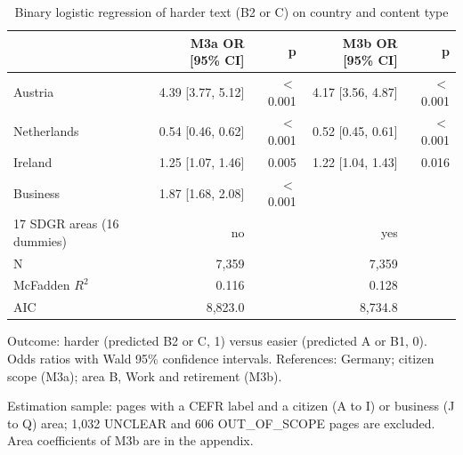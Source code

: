 \begin{table}[htbp]
\centering
\begin{threeparttable}
\caption{Binary logistic regression of harder text (B2 or C) on country and content type}
\label{tab:regression-main}
\begin{tabular}{lrrrr}
\hline
 & M3a OR [95\% CI] & p & M3b OR [95\% CI] & p \\
\hline
Austria & 4.39 [3.77, 5.12] & $<$0.001 & 4.17 [3.56, 4.87] & $<$0.001 \\
Netherlands & 0.54 [0.46, 0.62] & $<$0.001 & 0.52 [0.45, 0.61] & $<$0.001 \\
Ireland & 1.25 [1.07, 1.46] & 0.005 & 1.22 [1.04, 1.43] & 0.016 \\
Business & 1.87 [1.68, 2.08] & $<$0.001 &  &  \\
\hline
17 SDGR areas (16 dummies) & no &  & yes &  \\
N & 7,359 &  & 7,359 &  \\
McFadden $R^2$ & 0.116 &  & 0.128 &  \\
AIC & 8,823.0 &  & 8,734.8 &  \\
\hline
\end{tabular}
\begin{tablenotes}
\footnotesize
\item Outcome: harder (predicted B2 or C, 1) versus easier (predicted A or B1, 0). Odds ratios with Wald 95\% confidence intervals. References: Germany; citizen scope (M3a); area B, Work and retirement (M3b).
\item Estimation sample: pages with a CEFR label and a citizen (A to I) or business (J to Q) area; 1,032 UNCLEAR and 606 OUT\_OF\_SCOPE pages are excluded. Area coefficients of M3b are in the appendix.
\end{tablenotes}
\end{threeparttable}
\end{table}
